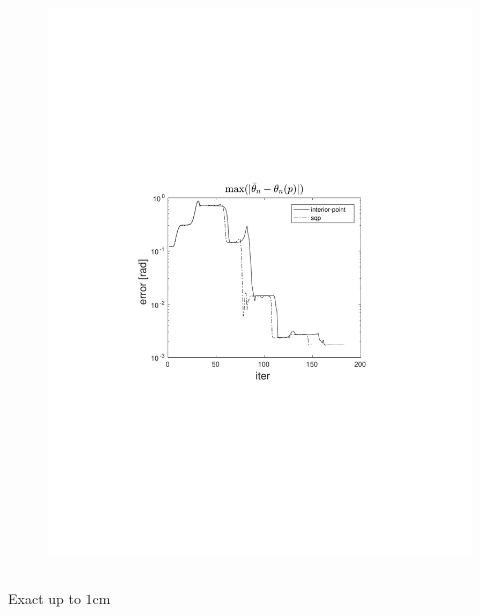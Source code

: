 \documentclass{beamer}
\begin{document}
\begin{frame}
\begin{columns}[t]
\begin{figure}
                \includegraphics[trim=4cm 9cm 4cm 8.5cm, clip=true, width=\linewidth]{img/convPlotT_1}
            \end{figure}
    \end{columns}

    \begin{center}
        Exact up to $1\text{cm}$
    \end{center}
\end{frame}
\end{document}
